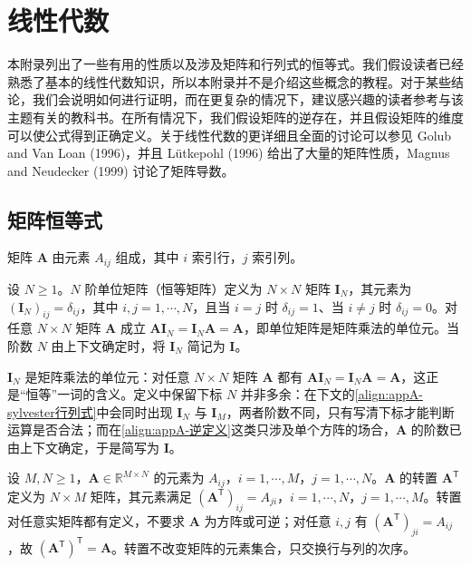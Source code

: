 \documentclass[../main.tex]{subfiles}
\begin{document}

\chapter{线性代数}\label{chapter:appA-线性代数}

本附录列出了一些有用的性质以及涉及矩阵和行列式的恒等式。我们假设读者已经熟悉了基本的线性代数知识，所以本附录并不是介绍这些概念的教程。对于某些结论，我们会说明如何进行证明，而在更复杂的情况下，建议感兴趣的读者参考与该主题有关的教科书。在所有情况下，我们假设矩阵的逆存在，并且假设矩阵的维度可以使公式得到正确定义。关于线性代数的更详细且全面的讨论可以参见 Golub and Van Loan (1996)，并且 Lütkepohl (1996) 给出了大量的矩阵性质，Magnus and Neudecker (1999) 讨论了矩阵导数。

\section{矩阵恒等式}\label{section:appA-矩阵恒等式}

矩阵 $\bm{A}$ 由元素 $A_{ij}$ 组成，其中 $i$ 索引行，$j$ 索引列。

\begin{definition}[恒等矩阵]\label{definition:appA-恒等矩阵}
设 $N\geqslant1$。$N$ 阶单位矩阵（恒等矩阵）定义为 $N\times N$ 矩阵 $\bm{I}_{N}$，其元素为 $(\bm{I}_{N})_{ij}=\delta_{ij}$，其中 $i,j=1,\cdots,N$，且当 $i=j$ 时 $\delta_{ij}=1$、当 $i\neq j$ 时 $\delta_{ij}=0$。对任意 $N\times N$ 矩阵 $\bm{A}$ 成立 $\bm{A}\bm{I}_{N}=\bm{I}_{N}\bm{A}=\bm{A}$，即单位矩阵是矩阵乘法的单位元。当阶数 $N$ 由上下文确定时，将 $\bm{I}_{N}$ 简记为 $\bm{I}$。
\end{definition}

\begin{remark}
$\bm{I}_{N}$ 是矩阵乘法的单位元：对任意 $N\times N$ 矩阵 $\bm{A}$ 都有 $\bm{A}\bm{I}_{N}=\bm{I}_{N}\bm{A}=\bm{A}$，这正是“恒等”一词的含义。定义中保留下标 $N$ 并非多余：在下文的\eqref{align:appA-sylvester行列式}中会同时出现 $\bm{I}_{N}$ 与 $\bm{I}_{M}$，两者阶数不同，只有写清下标才能判断运算是否合法；而在\eqref{align:appA-逆定义}这类只涉及单个方阵的场合，$\bm{A}$ 的阶数已由上下文确定，于是简写为 $\bm{I}$。
\end{remark}

\begin{definition}[转置]\label{definition:appA-转置}
设 $M,N\geqslant1$，$\bm{A}\in\mathbb{R}^{M\times N}$ 的元素为 $A_{ij}$，$i=1,\cdots,M$，$j=1,\cdots,N$。$\bm{A}$ 的转置 $\bm{A}^{\mathsf{T}}$ 定义为 $N\times M$ 矩阵，其元素满足 $(\bm{A}^{\mathsf{T}})_{ij}=A_{ji}$，$i=1,\cdots,N$，$j=1,\cdots,M$。转置对任意实矩阵都有定义，不要求 $\bm{A}$ 为方阵或可逆；对任意 $i,j$ 有 $(\bm{A}^{\mathsf{T}})_{ji}=A_{ij}$，故 $(\bm{A}^{\mathsf{T}})^{\mathsf{T}}=\bm{A}$。转置不改变矩阵的元素集合，只交换行与列的次序。
\end{definition}
\end{document}
